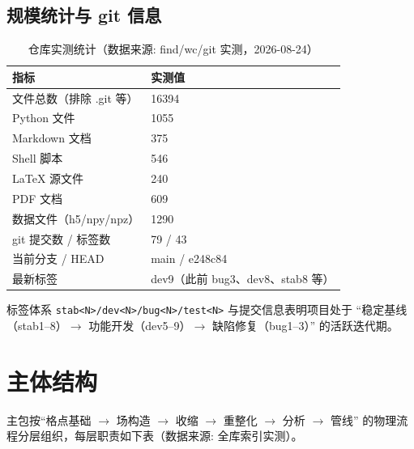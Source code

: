 \documentclass[UTF8]{ctexart}
\begin{document}
\subsection{规模统计与 git 信息}
\begin{table}[htbp]\centering
\begin{tabular}{ll}
\toprule
指标 & 实测值 \\
\midrule
文件总数（排除 .git 等） & 16394 \\
Python 文件 & 1055 \\
Markdown 文档 & 375 \\
Shell 脚本 & 546 \\
LaTeX 源文件 & 240 \\
PDF 文档 & 609 \\
数据文件（h5/npy/npz） & 1290 \\
git 提交数 / 标签数 & 79 / 43 \\
当前分支 / HEAD & main / e248c84 \\
最新标签 & dev9（此前 bug3、dev8、stab8 等） \\
\bottomrule
\end{tabular}
\caption{仓库实测统计（数据来源: find/wc/git 实测，2026-08-24）}
\end{table}

标签体系 \texttt{stab<N>/dev<N>/bug<N>/test<N>} 与提交信息表明项目处于
``稳定基线（stab1--8）$\to$ 功能开发（dev5--9）$\to$ 缺陷修复（bug1--3）'' 的活跃迭代期。

\section{主体结构}

主包按``格点基础 $\to$ 场构造 $\to$ 收缩 $\to$ 重整化 $\to$ 分析 $\to$ 管线''
的物理流程分层组织，每层职责如下表（数据来源: 全库索引实测）。
\end{document}
